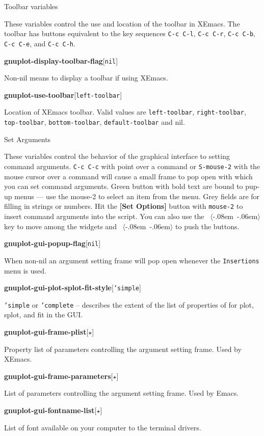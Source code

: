 \documentclass[twocolumn]{article}
\newenvironment{Boxedminipage}%
{\begin{Sbox}\begin{minipage}}%
  {\end{minipage}\end{Sbox}\Ovalbox{\TheSbox}}
\def\key#1{{\textrm \leavevmode\hbox{%
  \raise0.4pt\hbox{$\langle$}\kern-.08em\vtop{%
    \vbox{\hrule\kern-0.4pt
     \hbox{\raise0.4pt\hbox{\vphantom{$\langle$}}#1}}%
    \kern-0.4pt\hrule}%
  \kern-.06em\raise0.4pt\hbox{$\rangle$}}}}
\def\variable#1#2#3{{
    \vspace{-0.2truecm}
    \begin{flushright}
      \begin{minipage}[h]{0.97\linewidth}
        \vspace{-0.2truecm}
        \textbf{#1}\hfill[\texttt{#2}]
        \begin{flushright}
          \begin{minipage}[h]{0.93\linewidth}
            \vspace{-0.2truecm}
            #3
          \end{minipage}
        \end{flushright}
      \end{minipage}
    \end{flushright}
    }}
\def\Star{{$\star$}}
\begin{document}
\begin{center}
  \begin{Boxedminipage}{0.75\linewidth}
    \begin{center}
      {\large Toolbar variables}
    \end{center}
  \end{Boxedminipage}
\end{center}

\noindent These variables control the use and location of the
toolbar in XEmacs.  The toolbar has buttons equivalent to the key
sequences \texttt{C-c C-l}, \texttt{C-c C-r}, \texttt{C-c C-b},
\texttt{C-c C-e}, and \texttt{C-c C-h}.

\vspace{2ex}

%
\variable{gnuplot-display-toolbar-flag}{nil}{Non-nil means to display
  a toolbar if using XEmacs.}
%
\variable{gnuplot-use-toolbar}{left-toolbar}{Location of XEmacs
  toolbar.  Valid values are \texttt{left-toolbar},
  \texttt{right-toolbar}, \texttt{top-toolbar}, \texttt{bottom-toolbar},
  \texttt{default-toolbar} and nil.}
%

\begin{center}
  \begin{Boxedminipage}{0.75\linewidth}
    \begin{center}
      {\large Set Arguments}
    \end{center}
  \end{Boxedminipage}
\end{center}

\noindent These variables control the behavior of the graphical
interface to setting command arguments.  \texttt{C-c C-c} with point
over a command or \texttt{S-mouse-2} with the mouse cursor over a
command will cause a small frame to pop open with which you can set
command arguments.  Green button with bold text are bound to pup-up
menus --- use the mouse-2 to select an item from the menu.  Grey fields
are for filling in strings or numbers.  Hit the \textbf{[Set Options]}
button with \texttt{mouse-2} to insert command arguments into the
script.  You can also use the \key{tab} key to move among the widgets
and \key{ret} to push the buttons.

\vspace{2ex}
%
\variable{gnuplot-gui-popup-flag}{nil}{When non-nil an argument
setting frame will pop open whenever the \texttt{Insertions} menu is
used.}
%
\variable{gnuplot-gui-plot-splot-fit-style}{'simple}{\texttt{'simple}
  or \texttt{'complete} -- describes the extent of the list of
  properties of for plot, splot, and fit in the GUI.}
%
\variable{gnuplot-gui-frame-plist}{\Star}{Property list of parameters
  controlling the argument setting frame.  Used by XEmacs.}
%
\variable{gnuplot-gui-frame-parameters}{\Star}{List of parameters
  controlling the argument setting frame.  Used by Emacs.}
%
\variable{gnuplot-gui-fontname-list}{\Star}{List of font available on your
  computer to the terminal drivers.}
%
\end{document}
